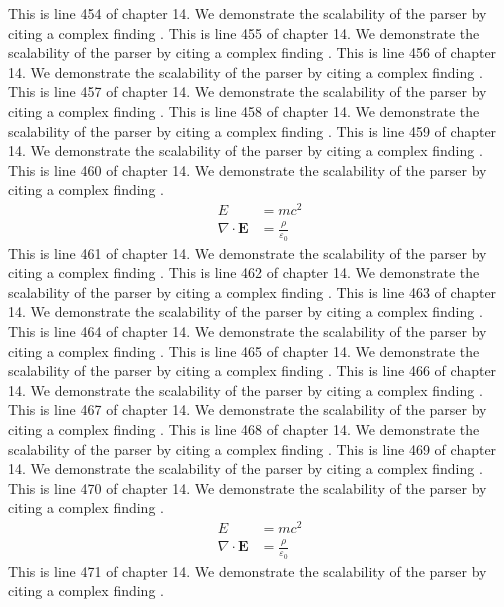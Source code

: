 This is line 454 of chapter 14. We demonstrate the scalability of the parser by citing a complex finding \cite{ref14_454}.
This is line 455 of chapter 14. We demonstrate the scalability of the parser by citing a complex finding \cite{ref14_455}.
This is line 456 of chapter 14. We demonstrate the scalability of the parser by citing a complex finding \cite{ref14_456}.
This is line 457 of chapter 14. We demonstrate the scalability of the parser by citing a complex finding \cite{ref14_457}.
This is line 458 of chapter 14. We demonstrate the scalability of the parser by citing a complex finding \cite{ref14_458}.
This is line 459 of chapter 14. We demonstrate the scalability of the parser by citing a complex finding \cite{ref14_459}.
This is line 460 of chapter 14. We demonstrate the scalability of the parser by citing a complex finding \cite{ref14_460}.
\begin{align*}
  E &= mc^2 \\
  \nabla \cdot \mathbf{E} &= \frac{\rho}{\varepsilon_0}
\end{align*}
This is line 461 of chapter 14. We demonstrate the scalability of the parser by citing a complex finding \cite{ref14_461}.
This is line 462 of chapter 14. We demonstrate the scalability of the parser by citing a complex finding \cite{ref14_462}.
This is line 463 of chapter 14. We demonstrate the scalability of the parser by citing a complex finding \cite{ref14_463}.
This is line 464 of chapter 14. We demonstrate the scalability of the parser by citing a complex finding \cite{ref14_464}.
This is line 465 of chapter 14. We demonstrate the scalability of the parser by citing a complex finding \cite{ref14_465}.
This is line 466 of chapter 14. We demonstrate the scalability of the parser by citing a complex finding \cite{ref14_466}.
This is line 467 of chapter 14. We demonstrate the scalability of the parser by citing a complex finding \cite{ref14_467}.
This is line 468 of chapter 14. We demonstrate the scalability of the parser by citing a complex finding \cite{ref14_468}.
This is line 469 of chapter 14. We demonstrate the scalability of the parser by citing a complex finding \cite{ref14_469}.
This is line 470 of chapter 14. We demonstrate the scalability of the parser by citing a complex finding \cite{ref14_470}.
\begin{align*}
  E &= mc^2 \\
  \nabla \cdot \mathbf{E} &= \frac{\rho}{\varepsilon_0}
\end{align*}
This is line 471 of chapter 14. We demonstrate the scalability of the parser by citing a complex finding \cite{ref14_471}.
